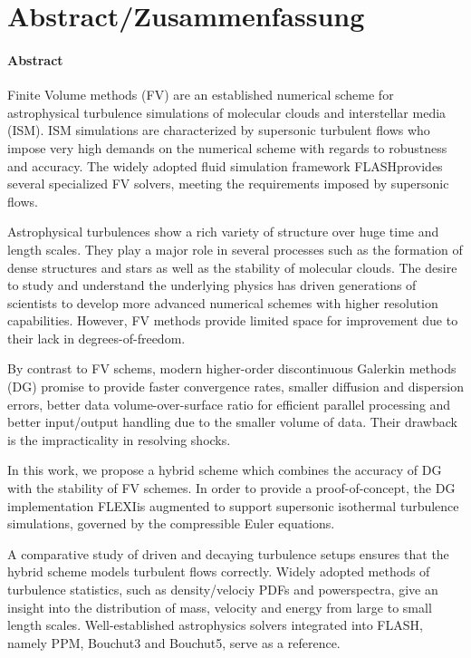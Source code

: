 \section*{Abstract/Zusammenfassung}
\paragraph{Abstract}
Finite Volume methods (FV) are an established numerical scheme for
astrophysical turbulence simulations of molecular clouds and interstellar media
(ISM). ISM simulations are characterized by supersonic turbulent flows who
impose very high demands on the numerical scheme with regards to robustness and
accuracy. The widely adopted fluid simulation framework FLASH\footnotemark provides
several specialized FV solvers, meeting the requirements imposed by supersonic
flows.

Astrophysical turbulences show a rich variety of structure over huge time and
length scales. They play a major role in several processes such as the
formation of dense structures and stars as well as the stability of molecular
clouds. The desire to study and understand the underlying physics has driven
generations of scientists to develop more advanced numerical schemes with
higher resolution capabilities. However, FV methods provide limited space for
improvement due to their lack in degrees-of-freedom.

By contrast to FV schems, modern higher-order discontinuous Galerkin methods
(DG) promise to provide faster convergence rates, smaller diffusion and
dispersion errors, better data volume-over-surface ratio for efficient parallel
processing and better input/output handling due to the smaller volume of data.
Their drawback is the impracticality in resolving shocks.

In this work, we propose a hybrid scheme which combines the accuracy of DG with
the stability of FV schemes. In order to provide a proof-of-concept, the DG
implementation FLEXI\footnotemark is augmented to support supersonic
isothermal turbulence simulations, governed by the compressible Euler
equations.

A comparative study of driven and decaying turbulence setups ensures that the
hybrid scheme models turbulent flows correctly. Widely adopted methods of
turbulence statistics, such as density/velociy PDFs and powerspectra, give an
insight into the distribution of mass, velocity and energy from large to small
length scales. Well-established astrophysics solvers integrated into FLASH,
namely PPM, Bouchut3 and Bouchut5, serve as a reference.

